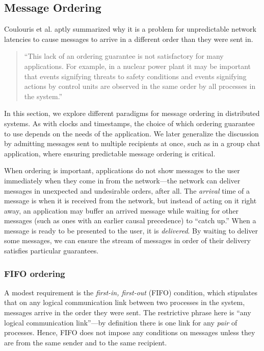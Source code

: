 \documentclass[]             %
{NASA}                       %
\theoremstyle{definition}
\begin{document}
\subsection{Message Ordering}
\label{ssec:message-ordering}
Coulouris et al. \cite{coulouris2005distributed} aptly summarized why
it is a problem for unpredictable network latencies to cause messages
to arrive in a different order than they were sent in.
\begin{quote}
  ``This lack of an ordering guarantee is not satisfactory for many
  applications. For example, in a nuclear power plant it may be
  important that events signifying threats to safety conditions and
  events signifying actions by control units are observed in the same
  order by all processes in the system.''
\end{quote}
In this section, we explore different paradigms for message ordering
in distributed systems. As with clocks and timestamps, the choice of
which ordering guarantee to use depends on the needs of the
application. We later generalize the discussion by admitting messages
sent to multiple recipients at once, such as in a group chat
application, where ensuring predictable message ordering is critical.

When ordering is important, applications do not show messages to the
user immediately when they come in from the network---the network can
deliver messages in unexpected and undesirable orders, after all. The
\emph{arrival} time of a message is when it is received from the
network, but instead of acting on it right away, an application may
buffer an arrived message while waiting for other messages (such as
ones with an earlier causal precedence) to ``catch up.'' When a
message is ready to be presented to the user, it is
\emph{delivered}. By waiting to deliver some messages, we can ensure
the stream of messages in order of their delivery satisfies particular
guarantees.

\subsubsection{FIFO ordering}
A modest requirement is the \emph{first-in, first-out} (FIFO)
condition, which stipulates that on any logical communication link
between two processes in the system, messages arrive in the order they
were sent. The restrictive phrase here is ``any logical communication
link''---by definition there is one link for any \emph{pair} of
processes. Hence, FIFO does not impose any conditions on messages
unless they are from the same sender and to the same recipient.
\end{document}
